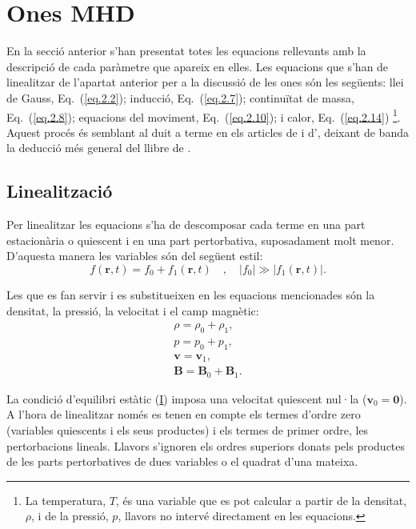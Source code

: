 
\chapter{Ones MHD} \label{sec:onesMHD}
En la secció anterior s'han presentat totes les equacions rellevants amb la descripció de cada paràmetre que apareix en elles.
Les equacions que s'han de linealitzar de l'apartat anterior per a la discussió de les ones són les següents:
llei de Gauss, Eq.~(\ref{eq.2.2}); inducció, Eq.~(\ref{eq.2.7}); continuïtat de massa, Eq.~(\ref{eq.2.8}); equacions del moviment, Eq.~(\ref{eq.2.10}); i calor, Eq.~(\ref{eq.2.14}) \footnote{La temperatura, $T$, és una variable que es pot calcular a partir de la densitat, $\rho$, i de la pressió, $p$, llavors no intervé directament en les equacions.}.
Aquest procés és semblant al duit a terme en els articles de \textcite{oscillation_modes_II} i d'\textcite{oscillations_quiescent_solar_prominence},
deixant de banda la deducció més general del llibre de \textcite{Priest_2014}.


\section{Linealització} \label{subsec:linealització}
Per linealitzar les equacions s'ha de descomposar cada terme en una part estacionària o quiescent i en una part pertorbativa, suposadament molt menor.
D'aquesta manera les variables són del següent estil:
\begin{equation}
	f(\bm{r},t) = f_0 + f_1(\bm{r},t) \quad , \quad |f_0| \gg |f_1(\bm{r},t)|. \tag{3.1} \label{3.1}
\end{equation}

Les que es fan servir i es substitueixen en les equacions mencionades són la densitat, la pressió, la velocitat i el camp magnètic:
\begin{gather}
	\rho = \rho_0 + \rho_1, \tag{3.2} \label{3.2} \\
	p = p_0 + p_1, \tag{3.3} \label{3.3} \\
	\bm{v} = \bm{v}_1, \tag{3.4} \label{3.4} \\
	\bm{B} = \bm{B}_0 + \bm{B}_1. \tag{3.5} \label{3.5}
\end{gather}

La condició d'equilibri estàtic (\hyperref[punt:I]{I}) imposa una velocitat quiescent nul·la ($\bm{v}_0 = \bm{0}$).
A l'hora de linealitzar només es tenen en compte els termes d'ordre zero (variables quiescents i els seus productes) i els termes de primer ordre, les pertorbacions lineals.
Llavors s'ignoren els ordres superiors donats pels productes de les parts pertorbatives de dues variables o el quadrat d'una mateixa.

